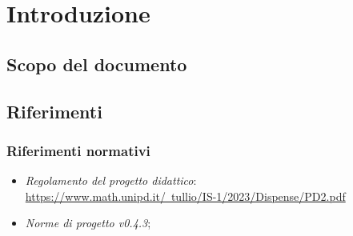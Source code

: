 \documentclass[10pt, a4paper]{article}
\title{\titolo}
\author{SWEetCode}
\begin{document}



\newpage

\tableofcontents
\newpage

\section{Introduzione}
\subsection{Scopo del documento}

\paragraph{}

\subsection{Riferimenti}
   \subsubsection{Riferimenti normativi}
   \begin{itemize}
    \item \textit{Regolamento del progetto didattico}: \\
    \href{https://www.math.unipd.it/~tullio/IS-1/2023/Dispense/PD2.pdf}{https://www.math.unipd.it/~tullio/IS-1/2023/Dispense/PD2.pdf}\\
    \item \textit{Norme di progetto v0.4.3};
    \end{itemize}
    
\end{document}
